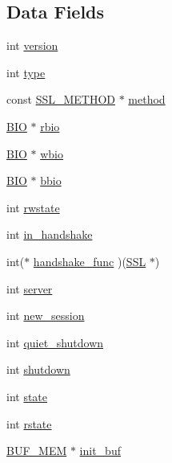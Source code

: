 \subsection*{Data Fields}
\begin{DoxyCompactItemize}
\item 
int \hyperlink{structssl__st_aad880fc4455c253781e8968f2239d56f}{version}
\item 
int \hyperlink{structssl__st_ac765329451135abec74c45e1897abf26}{type}
\item 
const \hyperlink{include_2openssl_2ssl_8h_a74d54b9a714accac31c73bfb55973e81}{S\+S\+L\+\_\+\+M\+E\+T\+H\+OD} $\ast$ \hyperlink{structssl__st_a6ad8f26b97b806807adf5b0dcebd3c2a}{method}
\item 
\hyperlink{crypto_2bio_2bio_8h_af3fabae1c9af50b9312cdff41e11d1dd}{B\+IO} $\ast$ \hyperlink{structssl__st_aca069ff9c8c6f5d1519091538d18989c}{rbio}
\item 
\hyperlink{crypto_2bio_2bio_8h_af3fabae1c9af50b9312cdff41e11d1dd}{B\+IO} $\ast$ \hyperlink{structssl__st_a4a0e45c6ce1f547d7b368e2fc85edeef}{wbio}
\item 
\hyperlink{crypto_2bio_2bio_8h_af3fabae1c9af50b9312cdff41e11d1dd}{B\+IO} $\ast$ \hyperlink{structssl__st_a42caaceefe4041557f7621c8aedcf57b}{bbio}
\item 
int \hyperlink{structssl__st_a2d687630f01b8b26bcdbd3e39fe7546a}{rwstate}
\item 
int \hyperlink{structssl__st_a0b9b2b7bc1ae244c06e63d6b82c1ce65}{in\+\_\+handshake}
\item 
int($\ast$ \hyperlink{structssl__st_af004e57c8a8ece62b8668c25ac3d4d97}{handshake\+\_\+func} )(\hyperlink{crypto_2ossl__typ_8h_a71f21e09bf365489dab9d85bd4785e24}{S\+SL} $\ast$)
\item 
int \hyperlink{structssl__st_ad41e465b11575618bf82f1d45efced5a}{server}
\item 
int \hyperlink{structssl__st_a57bf1fbedf3600008cf054e18d06d67c}{new\+\_\+session}
\item 
int \hyperlink{structssl__st_aa8eaa5b8fc4a19fa46dcac8863276b40}{quiet\+\_\+shutdown}
\item 
int \hyperlink{structssl__st_a5161d377a61befc3f8103e794d5cb582}{shutdown}
\item 
int \hyperlink{structssl__st_a89f234133d3efe315836311cbf21c64b}{state}
\item 
int \hyperlink{structssl__st_a2d7e02860edd1252fbd8cfb88749f364}{rstate}
\item 
\hyperlink{crypto_2ossl__typ_8h_aaea4d745bf2689d2009791186616bb3c}{B\+U\+F\+\_\+\+M\+EM} $\ast$ \hyperlink{structssl__st_af250aa342a4f3cd387094731a314ed9d}{init\+\_\+buf}

\end{DoxyCompactItemize}
